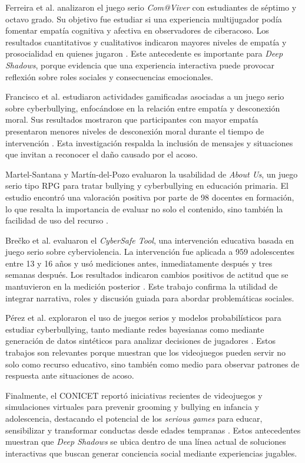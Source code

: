 \documentclass[conference]{IEEEtran}
\begin{document}
Ferreira et al. analizaron el juego serio \textit{Com@Viver} con estudiantes de séptimo y octavo grado. Su objetivo fue estudiar si una experiencia multijugador podía fomentar empatía cognitiva y afectiva en observadores de ciberacoso. Los resultados cuantitativos y cualitativos indicaron mayores niveles de empatía y prosocialidad en quienes jugaron \cite{ferreira2021}. Este antecedente es importante para \textit{Deep Shadows}, porque evidencia que una experiencia interactiva puede provocar reflexión sobre roles sociales y consecuencias emocionales.

Francisco et al. estudiaron actividades gamificadas asociadas a un juego serio sobre cyberbullying, enfocándose en la relación entre empatía y desconexión moral. Sus resultados mostraron que participantes con mayor empatía presentaron menores niveles de desconexión moral durante el tiempo de intervención \cite{francisco2024}. Esta investigación respalda la inclusión de mensajes y situaciones que invitan a reconocer el daño causado por el acoso.

Martel-Santana y Martín-del-Pozo evaluaron la usabilidad de \textit{About Us}, un juego serio tipo RPG para tratar bullying y cyberbullying en educación primaria. El estudio encontró una valoración positiva por parte de 98 docentes en formación, lo que resalta la importancia de evaluar no solo el contenido, sino también la facilidad de uso del recurso \cite{martel2025}.

Brečko et al. evaluaron el \textit{CyberSafe Tool}, una intervención educativa basada en juego serio sobre cyberviolencia. La intervención fue aplicada a 959 adolescentes entre 13 y 16 años y usó mediciones antes, inmediatamente después y tres semanas después. Los resultados indicaron cambios positivos de actitud que se mantuvieron en la medición posterior \cite{brecko2024}. Este trabajo confirma la utilidad de integrar narrativa, roles y discusión guiada para abordar problemáticas sociales.

Pérez et al. exploraron el uso de juegos serios y modelos probabilísticos para estudiar cyberbullying, tanto mediante redes bayesianas como mediante generación de datos sintéticos para analizar decisiones de jugadores \cite{perez2023,perez2024}. Estos trabajos son relevantes porque muestran que los videojuegos pueden servir no solo como recurso educativo, sino también como medio para observar patrones de respuesta ante situaciones de acoso.

Finalmente, el CONICET reportó iniciativas recientes de videojuegos y simulaciones virtuales para prevenir grooming y bullying en infancia y adolescencia, destacando el potencial de los \textit{serious games} para educar, sensibilizar y transformar conductas desde edades tempranas \cite{conicet2025}. Estos antecedentes muestran que \textit{Deep Shadows} se ubica dentro de una línea actual de soluciones interactivas que buscan generar conciencia social mediante experiencias jugables.
\end{document}
